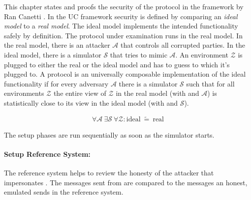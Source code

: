 \label{sec:security}

This chapter states and proofs the security of the protocol in the
 framework by Ran Canetti \cite{canetti05}.
In the UC framework security is defined by comparing an \emph{ideal model} to a
\emph{real model}. The ideal model implements the intended functionality
\JWfuncSym{}{} safely by definition. The protocol under examination runs in the
real model. In the real model, there is an attacker $\mathcal{A}$ that controls
all corrupted parties.  In the ideal model, there is a simulator $\mathcal{S}$
that tries to mimic $\mathcal{A}$. An environment $\mathcal{Z}$ is plugged to
either the real or the ideal model and has to guess to which it's plugged to. A
protocol \JWprotoSym{}{} is an universally composable implementation of the
ideal functionality if for every adversary $\mathcal{A}$ there is a
simulator $\mathcal{S}$ such that for all environments $\mathcal{Z}$ the entire
view of $\mathcal{Z}$ in the real model (with \JWprotoSym{}{} and $\mathcal{A}$)
is statistically close to its view in the ideal model (with \JWfuncSym{}{} and
$\mathcal{S}$).

\begin{align*}
%
\forall \mathcal{A}\ \exists \mathcal{S}\ \forall \mathcal{Z} :
\text{ideal}\ \widetilde{=}\ \text{real}
%
\end{align*}

%
%
\label{sec:simulators}


\label{sec:simulator-david}


The setup phases are run sequentially as soon as the simulator starts.

\paragraph{Setup Reference System:}

The reference system helps to review the honesty of the attacker \JWadv{}
that impersonates \JWpTwo{}. The messages sent from \JWadv{} are compared
to the messages an honest, emulated \JWpTwo{} sends in the reference system.

